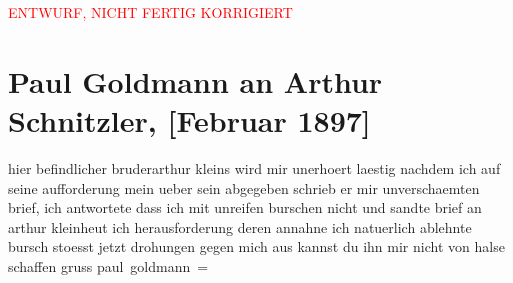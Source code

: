 
\begin{center}
            \textcolor{red}{ENTWURF, NICHT FERTIG KORRIGIERT}
                      \end{center}
            
               \section[Paul Goldmann an Arthur Schnitzler, {[}Februar 1897{]}]{ Paul Goldmann an Arthur Schnitzler, {[}Februar 1897{]}}\nopagebreak{}\rehead{ }\begin{ledgroupsized}[t]{13cm}\normalsize\beginnumbering{} \toendnotes[C]{\smallbreak\pagebreak[2]} 
\toendnotes[C]{\smallbreak}\pstart
           \noindent{}{\pb}hier befindlicher bruderarthur kleins wird mir unerhoert laestig nachdem ich auf seine
               aufforderung mein \label{T_L02638-3v}\label{T_L02638-3h} ueber sein \label{K_L02638-1v}\label{K_L02638-1h}
               abgegeben schrieb er mir unverschaemten brief, ich antwortete dass ich mit unreifen
               burschen nicht \label{T_L02638-2v}\label{T_L02638-2h} und sandte brief an arthur kleinheut{ }\label{T_L02638-1v}\label{T_L02638-1h} ich
               herausforderung deren annahne ich natuerlich ablehnte \label{T_L02638-4v}\label{T_L02638-4h} bursch stoesst jetzt drohungen gegen mich aus
               kannst du ihn mir nicht von halse schaffen\pend
           \pstart gruss \spacefill\mbox{paul goldmann =}\pend{}\endnumbering{}\end{ledgroupsized}  \newcommand{\dateiname}{L02638}\newcommand{\titel}{Paul Goldmann an Arthur Schnitzler, [Februar 1897]}\newcommand{\editorInnen}{Martin Anton Müller und Laura Untner}
            \footnotesize
\begin{ledgroupsized}[t]{11.5cm}
\end{ledgroupsized}
         
      